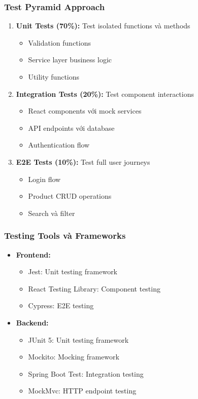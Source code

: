 \subsubsection{Test Pyramid Approach}
\begin{enumerate}
    \item \textbf{Unit Tests (70\%):} Test isolated functions và methods
    \begin{itemize}
        \item Validation functions
        \item Service layer business logic
        \item Utility functions
    \end{itemize}
    
    \item \textbf{Integration Tests (20\%):} Test component interactions
    \begin{itemize}
        \item React components với mock services
        \item API endpoints với database
        \item Authentication flow
    \end{itemize}
    
    \item \textbf{E2E Tests (10\%):} Test full user journeys
    \begin{itemize}
        \item Login flow
        \item Product CRUD operations
        \item Search và filter
    \end{itemize}
\end{enumerate}

\subsubsection{Testing Tools và Frameworks}
\begin{itemize}
    \item \textbf{Frontend:}
    \begin{itemize}
        \item Jest: Unit testing framework
        \item React Testing Library: Component testing
        \item Cypress: E2E testing
    \end{itemize}
    \item \textbf{Backend:}
    \begin{itemize}
        \item JUnit 5: Unit testing framework
        \item Mockito: Mocking framework
        \item Spring Boot Test: Integration testing
        \item MockMvc: HTTP endpoint testing
    \end{itemize}
\end{itemize}

